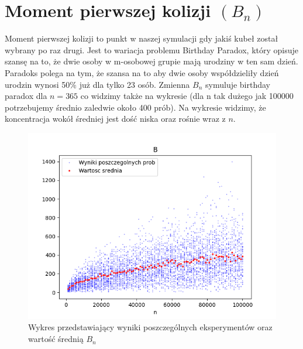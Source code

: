 \documentclass{report}
\begin{document}
\author{Jakub Ogrodowczyk}


\section*{Moment pierwszej kolizji \((B_n)\)}
\justifying
Moment pierwszej kolizji to punkt w naszej symulacji gdy jakiś kubeł został wybrany
po raz drugi. Jest to wariacja problemu Birthday Paradox, który opisuje szansę na to,
że dwie osoby w m-osobowej grupie mają urodziny w ten sam dzień.
Paradoks polega na tym, że szansa na to aby dwie osoby współdzieliły dzień urodzin
wynosi 50\% już dla tylko 23 osób. Zmienna \(B_n\) symuluje birthday paradox dla \(n=365\)
co widzimy także na wykresie (dla n tak dużego jak 100000 potrzebujemy średnio
 zaledwie około 400 prób). Na wykresie widzimy, że koncentracja wokół średniej jest
 dość niska oraz rośnie wraz z \(n\).
    \begin{figure}[htp]
        \centering
        \includegraphics[scale=0.7]{plotB.png}
        \caption[Example .]{Wykres przedstawiający wyniki poszczególnych eksperymentów oraz wartość średnią \(B_{n}\)}
        \label{plotB}
    \end{figure}
    
    \clearpage
\end{document}
